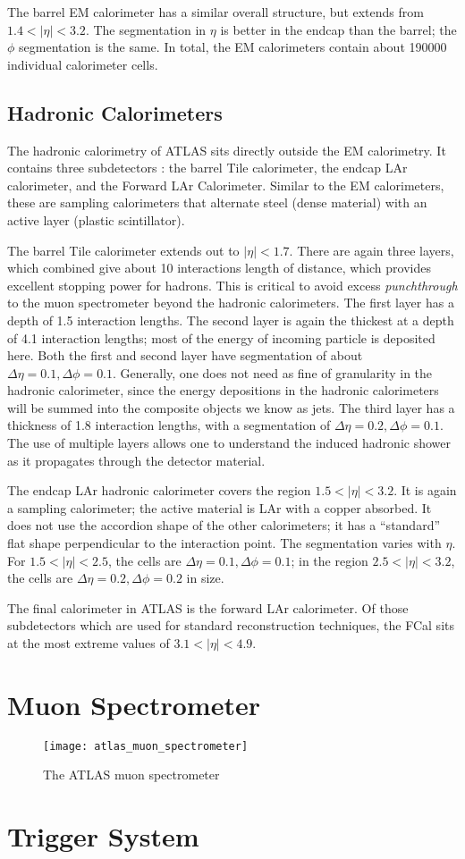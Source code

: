 The barrel EM calorimeter has a similar overall structure, but extends from $1.4 < |\eta| < 3.2$.
The segmentation in $\eta$ is better in the endcap than the barrel; the $\phi$ segmentation is the same.
In total, the EM calorimeters contain about 190000 individual calorimeter cells.


\subsection{Hadronic Calorimeters}

The hadronic calorimetry of ATLAS sits directly outside the EM calorimetry.
It contains three subdetectors : the barrel Tile calorimeter, the endcap LAr calorimeter, and the Forward  LAr Calorimeter.
Similar to the EM calorimeters, these are sampling calorimeters that alternate steel (dense material) with an active layer (plastic scintillator).

The barrel Tile calorimeter extends out to $|\eta| < 1.7$.
There are again three layers, which combined give about 10 interactions length of distance, which provides excellent stopping power for hadrons.
This is critical to avoid excess \textit{punchthrough} to the muon spectrometer beyond the hadronic calorimeters.
The first layer has a depth of 1.5 interaction lengths.
The second layer is again the thickest at a depth of 4.1 interaction lengths; most of the energy of incoming particle is deposited here.
Both the first and second layer have segmentation of about $\Delta\eta = 0.1, \Delta\phi = 0.1$.
Generally, one does not need as fine of granularity in the hadronic calorimeter, since the energy depositions in the hadronic calorimeters will be summed into the composite objects we know as jets.
The third layer has a thickness of 1.8 interaction lengths, with a segmentation of $\Delta\eta = 0.2, \Delta\phi = 0.1$.
The use of multiple layers allows one to understand the induced hadronic shower as it propagates through the detector material.

The endcap LAr hadronic calorimeter covers the region $1.5 < |\eta| < 3.2$.
It is again a sampling calorimeter; the active material is LAr with a copper absorbed.
It does not use the accordion shape of the other calorimeters; it has a ``standard'' flat shape perpendicular to the interaction point.
The segmentation varies with $\eta$.
For $1.5 < |\eta| < 2.5 $, the cells are $\Delta\eta = 0.1, \Delta\phi = 0.1$; in the region $2.5 < |\eta | < 3.2$, the cells are $\Delta\eta = 0.2, \Delta\phi = 0.2$ in size.

The final calorimeter in ATLAS is the forward LAr calorimeter.
Of those subdetectors which are used for standard reconstruction techniques, the FCal sits at the most extreme values of $ 3.1 < |\eta| < 4.9$.


\section{Muon Spectrometer}


\begin{figure}
\caption{The ATLAS muon spectrometer} \label{fig:atlas_muon_spectrometer}
\texttt{[image: atlas\_muon\_spectrometer]}
\end{figure}


\section{Trigger System}
